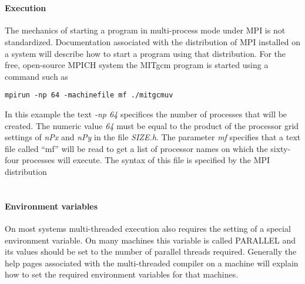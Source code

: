  \\
\paragraph{\bf Execution} The mechanics of starting a program in 
multi-process mode under MPI is not standardized. Documentation 
associated with the distribution of MPI installed on a system will
describe how to start a program using that distribution.
For the free, open-source MPICH system the MITgcm program is started
using a command such as
\begin{verbatim}
mpirun -np 64 -machinefile mf ./mitgcmuv
\end{verbatim}
In this example the text {\em -np 64} specifices the number of processes 
that will be created. The numeric value {\em 64} must be equal to the
product of the processor grid settings of {\em nPx} and {\em nPy}
in the file {\em SIZE.h}. The parameter {\em mf} specifies that a text file
called ``mf'' will be read to get a list of processor names on
which the sixty-four processes will execute. The syntax of this file
is specified by the MPI distribution
\\ 

 \\


\paragraph{Environment variables}
On most systems multi-threaded execution also requires the setting
of a special environment variable. On many machines this variable
is called PARALLEL and its values should be set to the number
of parallel threads required. Generally the help pages associated
with the multi-threaded compiler on a machine will explain
how to set the required environment variables for that machines.

